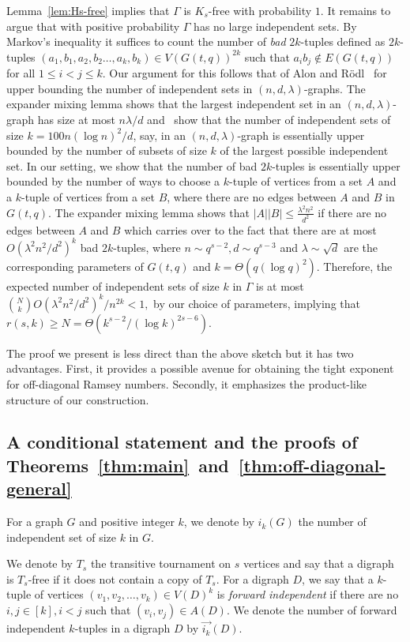 \documentclass{article}
\theoremstyle{plain}
\theoremstyle{definition}
\newcommand{\fwi}[1]{\overrightarrow{i_{#1}}}
\begin{document}
Lemma~\ref{lem:Hs-free} implies that $\Gamma$ is $K_s$-free with probability $1$. It remains to argue that with positive probability $\Gamma$ has no large independent sets. By Markov's inequality it suffices to count the number of \emph{bad} $2k$-tuples defined as $2k$-tuples $(a_1, b_1, a_2, b_2 \dots, a_k, b_k) \in V(G(t, q))^{2k}$ such that $a_i b_j \not\in E(G(t, q))$ for all $1 \le i < j \le k$. Our argument for this follows that of Alon and R\"{o}dl~\cite{alon-rodl} for upper bounding the number of independent sets in $(n, d, \lambda)$-graphs. The expander mixing lemma shows that the largest independent set in an $(n, d, \lambda)$-graph has size at most $n \lambda / d$ and~\cite{alon-rodl} show that the number of independent sets of size $k = 100 n (\log n)^2 / d$, say, in an $(n, d, \lambda)$-graph is essentially upper bounded by the number of subsets of size $k$ of the largest possible independent set. In our setting, we show that the number of bad $2k$-tuples is essentially upper bounded by the number of ways to choose a $k$-tuple of vertices from a set $A$ and a $k$-tuple of vertices from a set $B$, where there are no edges between $A$ and $B$ in $G(t, q)$. The expander mixing lemma shows that $|A||B| \le \frac{\lambda^2 n^2}{d^2}$ if there are no edges between $A$ and $B$ which carries over to the fact that there are at most $O(\lambda^2 n^2 / d^2)^k$ bad $2k$-tuples, where $n \sim q^{s-2}, d \sim q^{s-3}$ and $\lambda \sim \sqrt{d}$ are the corresponding parameters of $G(t, q)$ and $k = \Theta(q (\log q)^2)$. Therefore, the expected number of independent sets of size $k$ in $\Gamma$ is at most $\binom{N}{k} O(\lambda^2 n^2 / d^2)^k / n^{2k} < 1,$ by our choice of parameters, implying that $r(s, k) \ge N = \Theta(k^{s-2} / (\log k)^{2s-6})$.

The proof we present is less direct than the above sketch but it has two advantages. First, it provides a possible avenue for obtaining the tight exponent for off-diagonal Ramsey numbers. Secondly, it emphasizes the product-like structure of our construction.


\subsection{A conditional statement and the
proofs of Theorems~\ref{thm:main}~and~\ref{thm:off-diagonal-general}} \label{subsec:main-arg}
For a graph $G$ and positive integer $k$, we denote by $i_k(G)$ the number of independent set of size $k$ in $G$. 

We denote by $T_s$ the transitive tournament on $s$ vertices and say that a digraph is $T_s$-free if it does not contain a copy of $T_s$. For a digraph $D$, we say that a $k$-tuple of vertices $(v_1, v_2, \dots, v_k) \in V(D)^k$ is \emph{forward independent} if there are no $i, j \in [k], i < j$ such that $(v_i, v_j) \in A(D)$. We denote the number of forward independent $k$-tuples in a digraph $D$ by $\fwi{k}(D)$.
\end{document}
